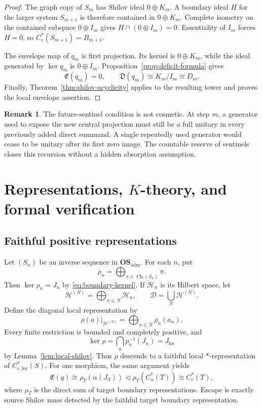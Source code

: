 \documentclass[11pt,a4paper]{amsart}
\theoremstyle{plain}
\theoremstyle{definition}
\newtheorem{remark}[theorem]{Remark}
\newcommand{\Cu}{C_u^*}
\newcommand{\Ce}{C_e^*}
\newcommand{\Celoc}{C_{e,\mathrm{loc}}^*}
\newcommand{\OSadm}{\mathbf{OS}_{\mathrm{adm}}}
\newcommand{\Esc}{\mathfrak E}
\newcommand{\Def}{\mathfrak D}
\newcommand{\Ch}{\operatorname{Ch}}
\begin{document}
\begin{proof}
The graph copy of $S_m$ has Shilov ideal $0\oplus K_m$.  A boundary ideal $H$ for the larger
system $S_{m+1}$ is therefore contained in $0\oplus K_m$.  Complete isometry on the contained
subspace $0\oplus I_m$ gives $H\cap(0\oplus I_m)=0$.  Essentiality of $I_m$ forces $H=0$, so
$\Ce(S_{m+1})=B_{m+1}$.

The envelope map of $q_m$ is first projection.  Its kernel is $0\oplus K_m$, while the ideal
generated by $\ker q_m$ is $0\oplus I_m$.  Proposition~\ref{prop:deficit-formula} gives
\[
 \Esc(q_m)=0,\qquad \Def(q_m)\cong K_m/I_m\cong D_m.
\]
Finally, Theorem~\ref{thm:shilov-acyclicity} applies to the resulting tower and proves the local
envelope assertion.
\end{proof}

\begin{remark}\label{rem:sentinel}
The future-sentinel condition is not cosmetic.  At step $m$, a generator used to expose the new
central projection must still be a full unitary in every previously added direct summand.  A
single repeatedly used generator would cease to be unitary after its first zero image.  The
countable reserve of sentinels closes this recursion without a hidden absorption assumption.
\end{remark}

\section{Representations, \texorpdfstring{$K$}{K}-theory, and formal verification}\label{sec:consequences}

\subsection{Faithful positive representations}

Let $(S_n)$ be an inverse sequence in $\OSadm$.  For each $n$, put
\[
 \rho_n=\bigoplus_{\pi\in\Ch(S_n)}\pi.
\]
Then $\ker\rho_n=J_n$ by \eqref{eq:boundary-kernel}.  If $\mathcal H_n$ is its Hilbert space, let
\[
 \mathcal H^{(N)}=\bigoplus_{n\leq N}\mathcal H_n,\qquad
 \mathcal D=\bigcup_N\mathcal H^{(N)}.
\]
Define the diagonal local representation by
\[
 \rho(a)|_{\mathcal H^{(N)}}=
 \bigoplus_{n\leq N}\rho_n(a_n).
\]
Every finite restriction is bounded and completely positive, and
\[
 \ker\rho=\bigcap_n p_n^{-1}(J_n)=J_{\mathrm{loc}}
\]
by Lemma~\ref{lem:local-shilov}.  Thus $\rho$ descends to a faithful local
$*$-representation of $\Celoc(S)$.  For one morphism, the same argument yields
\begin{equation}\label{eq:escape-detection}
 \Esc(q)\cong\rho_T(\alpha(J_S))\triangleleft\rho_T(\Cu(T))\cong\Ce(T),
\end{equation}
where $\rho_T$ is the direct sum of target boundary representations.  Escape is exactly source
Shilov mass detected by the faithful target boundary representation.
\end{document}
